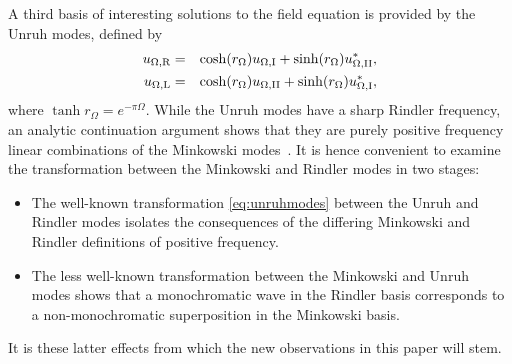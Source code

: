 A third basis of interesting solutions to the field equation 
is provided by the Unruh modes, 
defined by 
\begin{eqnarray}
\label{eq:unruhmodes}
u_{\Omega,\text{\text{R}}} &=& 
\cosh(r_\Omega)  u_{\Omega,\text{I}} + \sinh(r_\Omega)  u^{\ast}_{\Omega,\text{II}}, \nonumber\\
u_{\Omega,\text{\text{L}}} &=& 
\cosh(r_\Omega)  u_{\Omega,\text{II}} + \sinh(r_\Omega) u^{\ast}_{\Omega,\text{I}},
\end{eqnarray} 
where $\tanh r_\Omega= e^{-\pi\Omega}$. 
While the Unruh modes have a sharp Rindler frequency, an analytic continuation argument shows that they are
purely positive frequency linear combinations 
of the Minkowski modes~\cite{Unruh,Birrell}. 
It is hence convenient to examine the transformation 
between the Minkowski and Rindler modes in two stages:  
\begin{itemize}
\item The well-known transformation 
\eqref{eq:unruhmodes} between the Unruh and Rindler modes isolates the consequences of the differing Minkowski and Rindler definitions of positive frequency.
\item The less well-known transformation between the Minkowski and Unruh modes \cite{Takagi} shows that a monochromatic wave in the Rindler basis  corresponds to a non-monochromatic superposition in the Minkowski basis.
\end{itemize}
 It is these latter effects from which the new observations in this paper will stem. 



